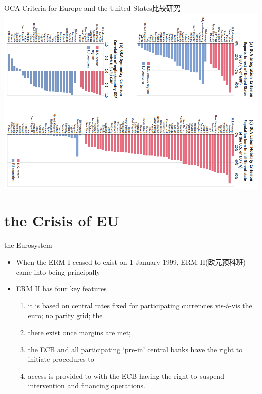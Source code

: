 \documentclass[10pt,hyperref={CJKbookmarks=true},xcolor=dvipsnames,aspectratio=169]{beamer}
\begin{document}
\begin{frame}{OCA Criteria for Europe and the United States比较研究}
		\centering
\includegraphics[scale=0.45]{fig/euro/oca}
\end{frame}

\section{the Crisis of EU}

\begin{frame}{the Eurosystem}
	\begin{itemize}
		\item When the ERM I ceased to exist on 1 January 1999, ERM II(欧元预科班) came into being principally
		\item ERM II has four key features
		\begin{enumerate}
			\item  it is based on central rates
			fixed for participating currencies vis-à-vis the euro; no parity grid; the 
			\item  there exist 
			once margins are met; 
			\item the ECB and all participating ‘pre-in’ central banks have	the right to initiate procedures to 
			\item access is provided to  with the ECB having the right to suspend intervention and financing operations.
		\end{enumerate}
	\end{itemize}
\end{frame}
\end{document}
